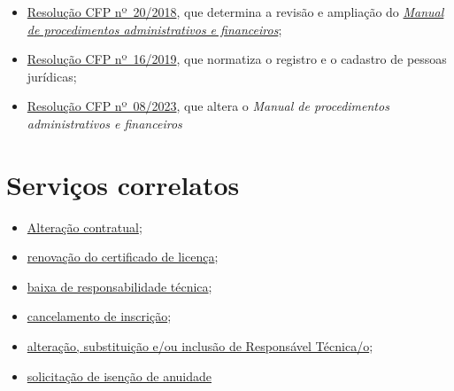 \begin{itemize}
  \item  \href{https://transparencia.cfp.org.br/wp-content/uploads/sites/7/2020/05/Manual-de-Procedimentos-Administrativos-e-Financeiro-CFP-RES-20.2018.pdf}{\href{https://atosoficiais.com.br/cfp/resolucao-administrativa-financeira-n-20-2018-altera-o-manual-de-procedimentos-administrativo-e-financeiro-do-sistema-conselhos-de-psicologia-anexo-da-resolucao-cfp-n-202018-a-resolucao-cfp-n-03-2007-a-resolucao-cfp-n-16-2019-e-da-outras-providencias}{Resolução  CFP nº~20/2018}}, que determina a revisão e ampliação do  \href{https://transparencia.cfp.org.br/wp-content/uploads/sites/7/2020/05/Manual-de-Procedimentos-Administrativos-e-Financeiro-CFP-RES-20.2018.pdf}{\emph{Manual  de procedimentos administrativos e financeiros}};
  \item  \href{https://atosoficiais.com.br/cfp/resolucao-administrativa-financeira-n-16-2019-altera-o-manual-de-procedimentos-administrativo-e-financeiro-do-sistema-conselhos-de-psicologia-anexo-da-resolucao-cfp-n-202018-a-resolucao-cfp-n-03-2007-a-resolucao-cfp-n-16-2019-e-da-outras-providencias}{Resolução  CFP nº~16/2019}, que normatiza o registro e o cadastro de pessoas  jurídicas;
  \item  \href{https://atosoficiais.com.br/cfp/resolucao-administrativa-financeira-n-8-2023-altera-o-manual-de-procedimentos-administrativo-e-financeiro-do-sistema-conselhos-de-psicologia-anexo-da-resolucao-cfp-n-202018-a-resolucao-cfp-n-03-2007-a-resolucao-cfp-n-16-2019-e-da-outras-providencias?origin=instituicao}{Resolução  CFP nº~08/2023}, que altera o \emph{Manual de procedimentos  administrativos e financeiros}
\end{itemize}

\section{Serviços correlatos}

\begin{itemize}
  \item  \hyperref[]{Alteração contratual};
  \item  \hyperref[]{renovação do  certificado de licença};
  \item  \hyperref[]{baixa de  responsabilidade técnica};
  \item  \hyperref[]{cancelamento de inscrição};
  \item  \hyperref[]{alteração,  substituição e/ou inclusão de Responsável Técnica/o};
  \item  \hyperref[]{solicitação  de isenção de anuidade}
\end{itemize}

